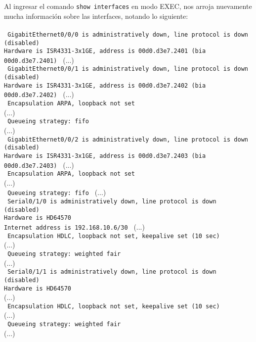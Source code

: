 \documentclass{article}
\begin{document}
Al ingresar el comando \texttt{show interfaces} en modo EXEC, nos arroja nuevamente mucha información sobre las interfaces, notando lo siguiente: \\\\

\texttt{
    GigabitEthernet0/0/0 is administratively down, line protocol is down (disabled) \\
    Hardware is ISR4331-3x1GE, address is 00d0.d3e7.2401 (bia 00d0.d3e7.2401)
}
(...) \\

\texttt{
    GigabitEthernet0/0/1 is administratively down, line protocol is down (disabled) \\
    Hardware is ISR4331-3x1GE, address is 00d0.d3e7.2402 (bia 00d0.d3e7.2402)
}
(...) \\
\texttt{
  Encapsulation ARPA, loopback not set
} \\
(...) \\
\texttt{
  Queueing strategy: fifo
} \\
(...) \\

\texttt{
    GigabitEthernet0/0/2 is administratively down, line protocol is down (disabled) \\
    Hardware is ISR4331-3x1GE, address is 00d0.d3e7.2403 (bia 00d0.d3e7.2403)
}
  (...) \\
\texttt{
  Encapsulation ARPA, loopback not set
} \\
  (...) \\
\texttt{  
  Queueing strategy: fifo
}
(...) \\

\texttt{
Serial0/1/0 is administratively down, line protocol is down (disabled) \\
  Hardware is HD64570 \\
  Internet address is 192.168.10.6/30
}
  (...) \\
\texttt{
  Encapsulation HDLC, loopback not set, keepalive set (10 sec)
} \\
  (...) \\
\texttt{
  Queueing strategy: weighted fair
} \\
(...) \\

\texttt{
Serial0/1/1 is administratively down, line protocol is down (disabled) \\
  Hardware is HD64570
} \\
  (...) \\
\texttt{
  Encapsulation HDLC, loopback not set, keepalive set (10 sec)
} \\
  (...) \\
\texttt{
  Queueing strategy: weighted fair
} \\
(...) \\
\end{document}
